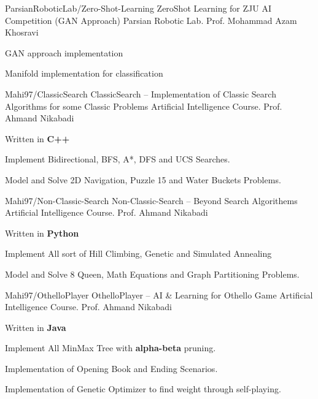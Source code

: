 \begin{cventries}
  \cventry
    {ParsianRoboticLab/Zero-Shot-Learning} %
    {ZeroShot Learning for ZJU AI Competition (GAN Approach)} %
    {Parsian Robotic Lab.} %
    {Prof. Mohammad Azam Khosravi} %
    {
      \begin{cvitems} %
        \item {GAN approach implementation}
        \item {Manifold implementation for classification}
      \end{cvitems}
    }


    \cventry
    {Mahi97/ClassicSearch} %
    {ClassicSearch -- Implementation of Classic Search Algorithms for some Classic Problems} %
    {Artificial Intelligence Course.} %
    {Prof. Ahmand Nikabadi} %
    {
      \begin{cvitems} %
        \item {Written in \textbf{C++}}
        \item {Implement Bidirectional, BFS, A*, DFS and UCS Searches.}
        \item {Model and Solve 2D Navigation, Puzzle 15 and Water Buckets Problems.}
      \end{cvitems}
    }
    
    
    \cventry
    {Mahi97/Non-Classic-Search} %
    {Non-Classic-Search -- Beyond Search Algorithems} %
    {Artificial Intelligence Course.} %
    {Prof. Ahmand Nikabadi} %
    {
      \begin{cvitems} %
         \item {Written in \textbf{Python}}
        \item {Implement All sort of Hill Climbing, Genetic and Simulated Annealing}
        \item {Model and Solve 8 Queen, Math Equations and Graph Partitioning Problems.}
      \end{cvitems}
    }    
    
    \cventry
    {Mahi97/OthelloPlayer} %
    {OthelloPlayer -- AI \& Learning for Othello Game} %
    {Artificial Intelligence Course.} %
    {Prof. Ahmand Nikabadi} %
    {
      \begin{cvitems} %
         \item {Written in \textbf{Java}}
        \item {Implement All MinMax Tree with \textbf{alpha-beta} pruning.}
        \item {Implementation of Opening Book and Ending Scenarios.}
        \item {Implementation of Genetic Optimizer to find weight through self-playing.}
      \end{cvitems}
    }
    

\end{cventries}
